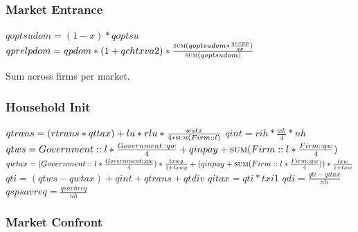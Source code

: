 \documentclass{article}
\begin{document}
\subsubsection{Market Entrance}

\begin{algorithm}[!htbp]
\caption{Market Entrance}
    \begin{algorithmic}
        \State \(qoptsudom = (1 - x) * qoptsu\)
        \EndFor
        \State \(qprelpdom = qpdom * (1 + qchtxva2) * \frac{\Call{sum}{qoptsudom * \frac{qexpp}{qp}}}{\Call{sum}{qoptsudom}}\)
        \EndFor
        \EndFunction
    \end{algorithmic}
    \small Sum across firms per market.
\end{algorithm}

\subsubsection{Household Init}

\begin{algorithm}[!htbp]
\caption{Init (Household)}
    \begin{algorithmic}
        \State \(qtrans = (rtrans * qttax) + lu * rlu * \frac{wstx}{4 * \Call{sum}{Firm::l}}\)
        \State \(qint = rih * \frac{wh}{4} * nh\)
        \State \(qtws = Government::l * \frac{Government::qw}{4} + qinpay + \Call{sum}{Firm::l * \frac{Firm::qw}{4}}\)
        \State \(qwtax = (Government::l * \frac{Government::qw}{4}) * \frac{txwg}{1 + txwg} + (qinpay + \Call{sum}{Firm::l * \frac{Firm::qw}{4}}) * \frac{txw}{1 + txw}\)
        \State \(qti = (qtws - qwtax) + qint + qtrans + qtdiv\)
        \State \(qitax = qti * txi1\)
        \State \(qdi = \frac{qti - qitax}{nh}\)
        \State \(qspsavreq = \frac{qsavhreq}{nh}\)
        \EndFunction
    \end{algorithmic}
\end{algorithm}

\subsubsection{Market Confront}
\end{document}

